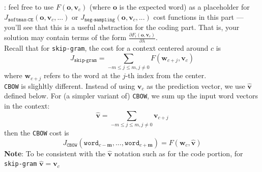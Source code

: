 \documentclass[letter,12pt]{article}
\begin{document}
: feel free to use $F({\boldsymbol o}, {\boldsymbol v}_{c})$ (where ${\boldsymbol o}$ is the expected word) as a placeholder for $J_{\texttt{softmax-CE}}({\boldsymbol o}, {\boldsymbol v}_{c}, ...)$ or $J_{\texttt{neg-sampling}}({\boldsymbol o}, {\boldsymbol v}_{c}, ...)$ cost functions in this part --- you'll see that this is a useful abstraction for the coding part. That is, your solution may contain terms of the form $\frac{\partial{F_{i}({\boldsymbol o}, {\boldsymbol v}_{c})}}{\partial\lambda}$.\\

\noindent Recall that for \texttt{skip-gram}, the cost for a context centered around $c$ is
\begin{equation}
J_{\texttt{skip-gram}} =   \sum_{-m\le j\le m, j\neq0}F({\boldsymbol w}_{c+j}, {\boldsymbol v}_{c})
\end{equation}
where ${\boldsymbol w}_{c+j}$ refers to the word at the $j$-th index from the center.\\

\noindent \texttt{CBOW} is slighltly different. Instead of using ${\boldsymbol v}_{c}$ as the prediction vector, we use $\hat{\boldsymbol v}$ defined below. For (a simpler variant of) \texttt{CBOW}, we sum up the input word vectors in the context:\\
\begin{equation}
\hat{\boldsymbol v} = \sum_{-m\le j\le m, j\neq0}{\boldsymbol v}_{c+j}
\end{equation}
then the \texttt{CBOW} cost is
\begin{equation}
J_{\texttt{CBOW}}(\texttt{word}_{c-\textbf{m}} ,...,\texttt{word}_{c+\textbf{m}}) = F({\boldsymbol w}_{c}, \hat{\boldsymbol v})
\end{equation}
\noindent\textbf{Note}: To be consistent with the $\hat{\boldsymbol v}$ notation such as for the code portion, for \texttt{skip-gram} $\hat{\boldsymbol v} = {\boldsymbol v_{c}}$

%
\end{document}
